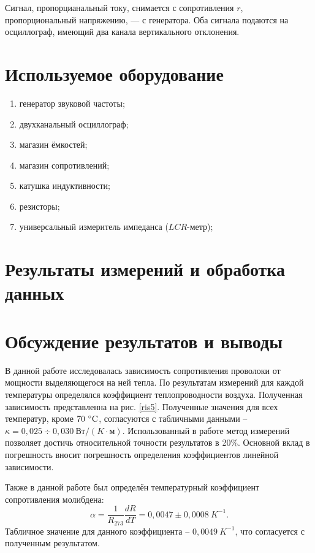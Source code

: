 \documentclass[a4paper, 12pt]{article}
\begin{document}
Сигнал, пропорцианальный току, снимается с сопротивления $r$, пропорциональный напряжению, --- с генератора. Оба сигнала подаются на осциллограф, имеющий два канала вертикального отклонения.

\section{Используемое оборудование}

\begin{enumerate}
    \item генератор звуковой частоты;
    \item двухканальный осциллограф;
    \item магазин ёмкостей;
    \item магазин сопротивлений;
    \item катушка индуктивности;
    \item резисторы;
    \item универсальный измеритель импеданса ($LCR$-метр);
\end{enumerate}

\section{Результаты измерений и обработка данных}



\section{Обсуждение результатов и выводы}

В данной работе исследовалась зависимость сопротивления проволоки от мощности выделяющегося на ней тепла. По результатам измерений для каждой температуры определялся коэффициент теплопроводности воздуха. Полученная зависимость представленна на рис. \ref{ris5}. Полученные значения для всех температур, кроме $70~\celsius$, согласуются с табличными данными -- $\kappa = 0,025\div0,030~Вт/(K \cdot м)$.
Использованный в работе метод измерений позволяет достичь относительной точности результатов в 20\%. Основной вклад в погрешность вносит погрешность определения коэффициентов линейной зависимости.

Также в данной работе был определён температурный коэффициент сопротивления молибдена:
$$\boxed{\alpha = \frac{1}{R_{273}}\frac{dR}{dT} = 0,0047\pm0,0008~K^{-1}}.$$
Табличное значение для данного коэффициента -- $0,0049~K^{-1}$, что согласуется с полученным результатом.
\end{document}
